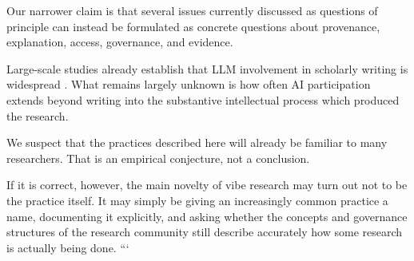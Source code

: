 Our narrower claim is that several issues currently discussed as questions of principle can instead be formulated as concrete questions about provenance, explanation, access, governance, and evidence.

Large-scale studies already establish that LLM involvement in scholarly writing is widespread \citep{liangEtAl2024mapping,kobakEtAl2024biomedical,gray2025prevalence}. What remains largely unknown is how often AI participation extends beyond writing into the substantive intellectual process which produced the research.

We suspect that the practices described here will already be familiar to many researchers. That is an empirical conjecture, not a conclusion.

If it is correct, however, the main novelty of vibe research may turn out not to be the practice itself. It may simply be giving an increasingly common practice a name, documenting it explicitly, and asking whether the concepts and governance structures of the research community still describe accurately how some research is actually being done.
```
